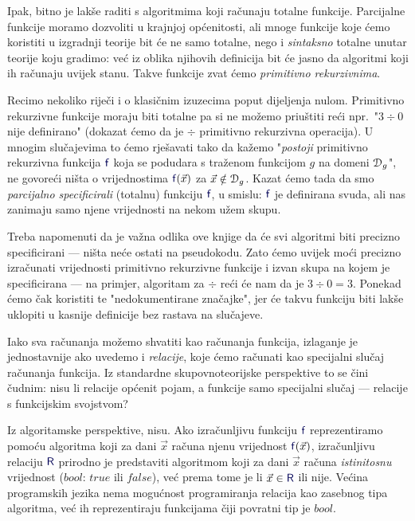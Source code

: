 Ipak, bitno je lakše raditi s algoritmima koji računaju totalne funkcije. Parcijalne funkcije moramo dozvoliti u krajnjoj općenitosti, ali mnoge funkcije koje ćemo koristiti u izgradnji teorije bit će ne samo totalne, nego i \emph{sintaksno} totalne unutar teorije koju gradimo: već iz oblika njihovih definicija bit će jasno da algoritmi koji ih računaju uvijek stanu. Takve funkcije zvat ćemo \emph{primitivno rekurzivnima}.

Recimo nekoliko riječi i o klasičnim izuzecima poput dijeljenja nulom. Primitivno rekurzivne funkcije moraju biti totalne pa si ne možemo priuštiti reći npr.\ "$3\div0$ nije definirano" (dokazat ćemo da je $\div$ primitivno rekurzivna operacija). U mnogim slučajevima to ćemo rješavati tako da kažemo "\emph{postoji} primitivno rekurzivna funkcija $\f{f}$ koja se podudara s traženom funkcijom $g$ na domeni $\mathcal D_{g}$", ne govoreći ništa o vrijednostima $\f{f}(\vec x)$ za $\vec x\notin\mathcal D_{g}$. %
Kazat ćemo tada da smo \emph{parcijalno specificirali} (totalnu) funkciju $\f{f}$, u smislu: $\f{f}$ je definirana svuda, ali nas zanimaju samo njene vrijednosti na nekom užem skupu.

Treba napomenuti da je važna odlika ove knjige da će svi algoritmi biti precizno specificirani --- ništa neće ostati na pseudokodu. Zato ćemo uvijek moći precizno izračunati vrijednosti primitivno rekurzivne funkcije i izvan skupa na kojem je specificirana --- na primjer, algoritam za $\div$ reći će nam da je $3\div 0=3$. Ponekad ćemo čak koristiti te "nedokumentirane značajke", jer će takvu funkciju biti lakše uklopiti u kasnije definicije bez rastava na slučajeve. %


Iako sva računanja možemo shvatiti kao računanja funkcija, izlaganje je jednostavnije ako uvedemo i \emph{relacije}, koje ćemo računati kao specijalni slučaj računanja funkcija. Iz standardne skupovnoteorijske perspektive to se čini čudnim: nisu li relacije općenit pojam, a funkcije samo specijalni slučaj --- relacije s funkcijskim svojstvom?

Iz algoritamske perspektive, nisu. Ako izračunljivu funkciju $\f{f}$ reprezentiramo po\-mo\-ću algoritma koji za dani $\vec x$ računa njenu vrijednost $\f{f}(\vec x)$, izračunljivu relaciju $\f{R}$ prirodno je predstaviti algoritmom koji za dani $\vec x$ računa \emph{istinitosnu} vrijednost ($bool$: $\mathit{true}$ ili $\mathit{false}$), već prema tome je li $\vec x\in\f{R}$ ili nije. Većina programskih jezika nema mogućnost programiranja relacija kao zasebnog tipa algoritma, već ih reprezentiraju funkcijama čiji povratni tip je $bool$.

